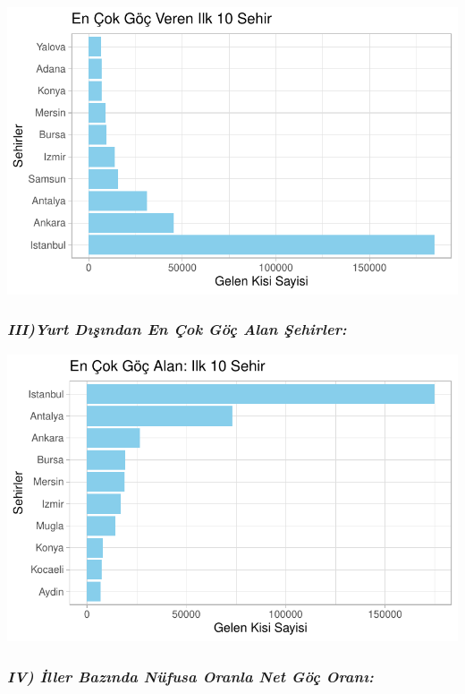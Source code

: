 \documentclass[
  11pt,
  a4paper,
  DIV=11,
  numbers=noendperiod]{scrartcl}
\begin{document}
\includegraphics{project_files/figure-pdf/unnamed-chunk-4-1.pdf}

\subsubsection{\texorpdfstring{\emph{III)Yurt Dışından En Çok Göç Alan
Şehirler:}}{III)Yurt Dışından En Çok Göç Alan Şehirler:}}\label{iiiyurt-dux131ux15fux131ndan-en-uxe7ok-guxf6uxe7-alan-ux15fehirler}

\includegraphics{project_files/figure-pdf/unnamed-chunk-5-1.pdf}

\subsubsection{\texorpdfstring{\emph{IV) İller Bazında Nüfusa Oranla Net
Göç
Oranı:}}{IV) İller Bazında Nüfusa Oranla Net Göç Oranı:}}\label{iv-iller-bazux131nda-nuxfcfusa-oranla-net-guxf6uxe7-oranux131}
\end{document}
